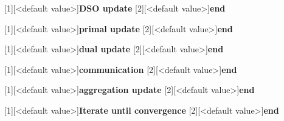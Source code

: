 \documentclass[10pt]{article}
\newtheorem{definitiox	n}{Definition}{\it}{}
\newcommand{\0}{\mathbf{0}}
\newcommand{\1}{\mathbf{1}}
\begin{document}
\newpage

[1][<default value>]{\textbf{DSO update}}
[2][<default value>]{\textbf{end}}

[1][<default value>]{\textbf{primal update}}
[2][<default value>]{\textbf{end}}

[1][<default value>]{\textbf{dual update}}
[2][<default value>]{\textbf{end}}

[1][<default value>]{\textbf{communication}}
[2][<default value>]{\textbf{end}}

[1][<default value>]{\textbf{aggregation update}}
[2][<default value>]{\textbf{end}}

[1][<default value>]{\textbf{Iterate until convergence}}
[2][<default value>]{\textbf{end}}
\end{document}
